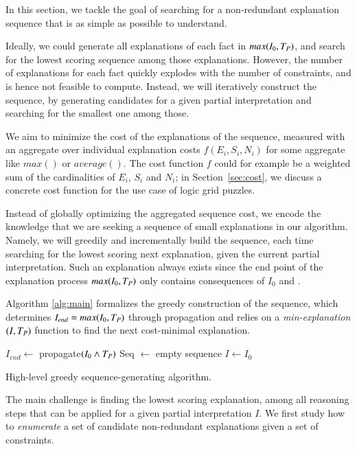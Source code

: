 In this section, we tackle the goal of searching for a non-redundant explanation sequence that is as simple as possible to understand.

Ideally, we could generate all explanations of each fact in $max(I_0,T_P)$, and search for the lowest scoring sequence among those explanations. However, the number of explanations for each fact quickly explodes with the number of constraints, and is hence not feasible to compute. Instead, we will iteratively construct the sequence, by generating candidates for a given partial interpretation and searching for the smallest one among those.

We aim to minimize the cost of the explanations of the sequence, measured with an aggregate over individual explanation costs $f(E_i, S_i, N_i)$ for some aggregate like $max()$ or $average()$. The cost function $f$ could for example be a weighted sum of the cardinalities of $E_i$, $S_i$ and $N_i$; in Section~\ref{sec:cost}, we discuss a concrete cost function for the use case of logic grid puzzles.

Instead of globally optimizing the aggregated sequence cost, we encode the knowledge that we are seeking a sequence of small explanations in our algorithm. Namely, we will greedily and incrementally build the sequence, each time searching for the lowest scoring next explanation, given the current partial interpretation. Such an explanation always exists since the end point of the explanation process $max(I_0,T_P)$ only contains consequences of $I_0$ and \allconstraints.

Algorithm \ref{alg:main} formalizes the greedy construction of the sequence, which determines $I_{end} = max(I_0,T_P)$  through propagation and relies on a \textit{min-explanation$(I,T_P)$} function to find the next cost-minimal explanation.

\begin{algorithm}
	\DontPrintSemicolon
  $I_{end} \gets$ propagate$(I_0\land T_P)$\;
  Seq $\gets$ empty sequence\;
  $I \gets I_0$\;
  \caption{High-level greedy sequence-generating algorithm.}
  \label{alg:main}
\end{algorithm}
The main challenge is finding the lowest scoring explanation, among all reasoning steps that can be applied for a given partial interpretation $I$. We first study how to \textit{enumerate} a set of candidate non-redundant explanations given a set of constraints.

